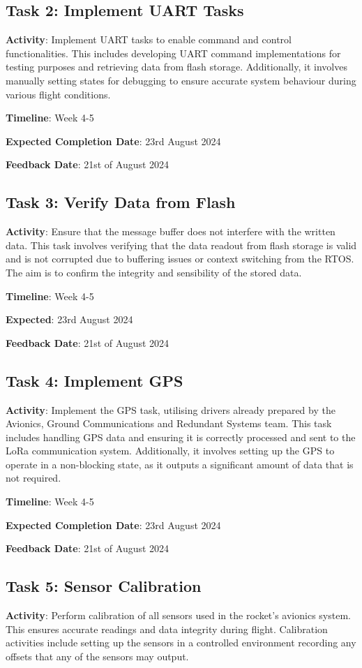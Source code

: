 \subsection{Task 2: Implement UART Tasks}
\textbf{Activity}: Implement UART tasks to enable command and control functionalities. This includes developing UART command implementations for testing purposes and retrieving data from flash storage. Additionally, it involves manually setting states for debugging to ensure accurate system behaviour during various flight conditions. 

\textbf{Timeline}: Week 4-5

\textbf{Expected Completion Date}: 23rd August 2024

\textbf{Feedback Date}: 21st of August 2024

\subsection{Task 3: Verify Data from Flash}
\textbf{Activity}: Ensure that the message buffer does not interfere with the written data. This task involves verifying that the data readout from flash storage is valid and is not corrupted due to buffering issues or context switching from the RTOS. The aim is to confirm the integrity and sensibility of the stored data. 

\textbf{Timeline}: Week 4-5

\textbf{Expected}: 23rd August 2024

\textbf{Feedback Date}: 21st of August 2024

\subsection{Task 4: Implement GPS}
\textbf{Activity}: Implement the GPS task, utilising drivers already prepared by the Avionics, Ground Communications and Redundant Systems team. This task includes handling GPS data and ensuring it is correctly processed and sent to the LoRa communication system. Additionally, it involves setting up the GPS to operate in a non-blocking state, as it outputs a significant amount of data that is not required. 

\textbf{Timeline}: Week 4-5

\textbf{Expected Completion Date}: 23rd August 2024

\textbf{Feedback Date}: 21st of August 2024

\subsection{Task 5: Sensor Calibration}
\textbf{Activity}: Perform calibration of all sensors used in the rocket's avionics system. This ensures accurate readings and data integrity during flight. Calibration activities include setting up the sensors in a controlled environment recording any offsets that any of the sensors may output.

